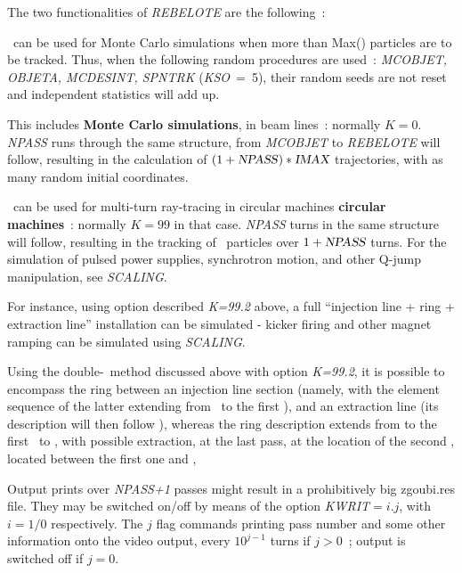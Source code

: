 \bigskip

The two functionalities of \textsl{REBELOTE} are the following~: 

\smallskip

\noindent {\small $\bullet$} \REBELOTE\ can be used for Monte Carlo simulations when more 
than Max(\IMAX) particles   are to be tracked. 
Thus, when the following random procedures 
are used~: \textsl{MCOBJET, OBJETA, MCDESINT, 
SPNTRK} \mbox{(\textsl{KSO} = 5)},
their random seeds are not reset and  independent statistics will add up. 

\noindent This includes  \textbf{Monte Carlo simulations}, in beam lines~: normally $ K=0$.  \textsl{NPASS} runs
through the same structure, from \textsl{MCOBJET} to \textsl{REBELOTE} will follow, resulting in the calculation of 
$(1+\text{\textsl{NPASS}})  \ast  \text{\ensuremath{\textsl{IMAX}}}$ trajectories, with as many random initial coordinates. 

\bigskip

\noindent {\small $\bullet$} \REBELOTE\ can be used for  multi-turn ray-tracing 
in circular machines \textbf{circular machines}~: normally $ K=99$ in that case.  \textsl{NPASS} turns in
the same structure will follow, resulting in the tracking of \IMAX\ 
particles over $1+\text{\textsl{NPASS}}$ turns. For the simulation of 
pulsed power supplies, synchrotron motion, and other Q-jump manipulation, see \textsl{SCALING}. 

\noindent For instance, using option described \textsl{K=99.2} above, a full ``injection line + ring + extraction line'' installation 
can be simulated - kicker firing  and other magnet ramping can be simulated using \textsl{SCALING}. 

\noindent Using the double-\LABEL\ method discussed above with option \textsl{K=99.2}, it is possible to encompass the ring between 
an injection line section (namely, with the element sequence of the latter extending from \OBJET\ to the first \LABEL), 
and an extraction line (its description will then follow \REBELOTE), 
whereas the ring description extends  from  to the first \LABEL\ to \REBELOTE, 
with possible extraction, at the last pass, at the location of the second \LABEL, located between the first one and \REBELOTE, 

\bigskip

\noindent Output prints over \textsl{NPASS+1} passes  might result in a
prohibitively big zgoubi.res file. They may be switched on/off  by means of the option 
\mbox{\textsl{KWRIT}$= i.j$}, with $i=1/0$ respectively. The $j$ flag commands printing 
pass number and some other information onto the video output, every $10^{j-1}$ turns if $j>0$~; output is switched  
off if $j=0$. 

